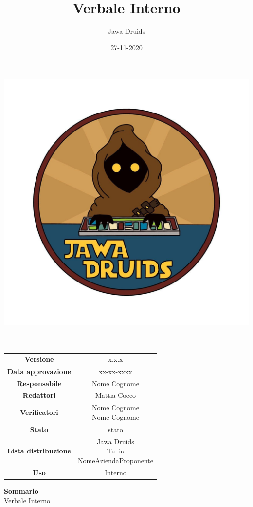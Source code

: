 \documentclass[a4paper,12pt]{report}
\begin{document}
	
	\makeatletter
	\begin{titlepage}
		\begin{center}
			\vspace*{-4,0cm}
			\author{Jawa Druids} 
			\title{Verbale Interno}
			\date{27-11-2020} %
			\includegraphics[width=0.7\linewidth]{../immagini/DRUIDSLOGO.jpg}\\[4ex]
			{\huge \bfseries  \@title }\\[2ex] 
			{\LARGE  \@author}\\[50ex]
			\vspace*{-8,0cm}
			\begin{table}[H]
				\centering
				\begin{tabular}{c|c}
					\textbf{Versione} & x.x.x \\
					\textbf{Data approvazione} & xx-xx-xxxx\\
					\textbf{Responsabile} & Nome Cognome\\
					\textbf{Redattori} & Mattia Cocco \\
					\textbf{Verificatori} & \makecell{Nome Cognome \\ Nome Cognome} \\
					\textbf{Stato} & stato\\
					\textbf{Lista distribuzione} & \makecell{Jawa Druids \\ Tullio \\ NomeAziendaProponente}\\
					\textbf{Uso} & Interno            
				\end{tabular}
			\end{table}
			\fontsize{16}{10}\textbf{Sommario} \\
			Verbale Interno
		\end{center}
	\end{titlepage}
\end{document}
